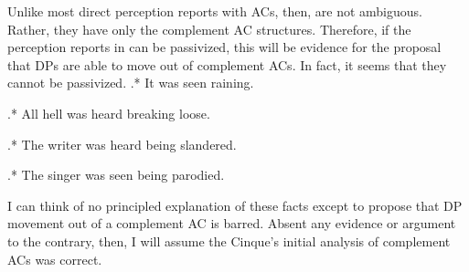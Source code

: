 \documentclass[MilwayThesis]{subfiles}
\begin{document}
Unlike most direct perception reports with ACs, then,  are not ambiguous.
Rather, they have only the complement AC structures.
Therefore, if the perception reports in  can be passivized, this will be evidence for the proposal that DPs are able to move out of complement ACs.
In fact, it seems that they cannot be passivized.
\ex.* It was seen raining.

\ex.* All hell was heard breaking loose.

\ex.* The writer was heard being slandered.

\ex.* The singer was seen being parodied.

I can think of no principled explanation of these facts except to propose that DP movement out of a complement AC is barred.
Absent any evidence or argument to the contrary, then, I will assume the Cinque's initial analysis of complement ACs was correct.
\end{document}
